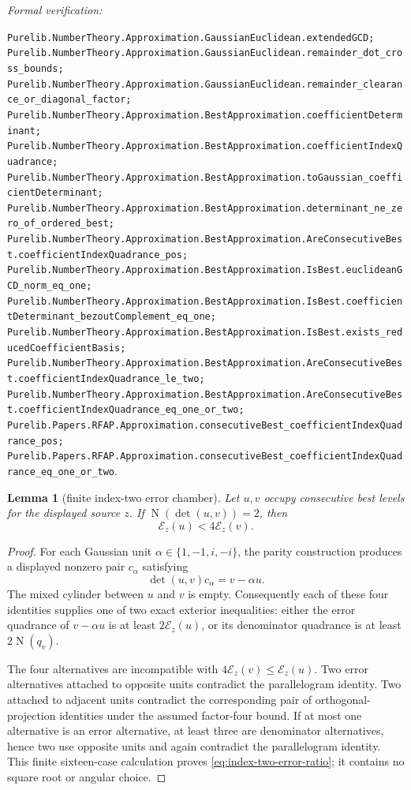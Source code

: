 \documentclass[11pt]{article}
\newtheorem{lemma}[lemma]{Lemma}
\newcommand{\Norm}[1]{\operatorname{N}\!\left(#1\right)}
\newcommand{\leanref}[1]{\par\smallskip\noindent
  \emph{Formal verification:}\par\nobreak
  {\raggedright\nolinkurl{#1}.\par}}
\begin{document}
\leanref{Purelib.NumberTheory.Approximation.GaussianEuclidean.extendedGCD;
Purelib.NumberTheory.Approximation.GaussianEuclidean.remainder_dot_cross_bounds;
Purelib.NumberTheory.Approximation.GaussianEuclidean.remainder_clearance_or_diagonal_factor;
Purelib.NumberTheory.Approximation.BestApproximation.coefficientDeterminant;
Purelib.NumberTheory.Approximation.BestApproximation.coefficientIndexQuadrance;
Purelib.NumberTheory.Approximation.BestApproximation.toGaussian_coefficientDeterminant;
Purelib.NumberTheory.Approximation.BestApproximation.determinant_ne_zero_of_ordered_best;
Purelib.NumberTheory.Approximation.BestApproximation.AreConsecutiveBest.coefficientIndexQuadrance_pos;
Purelib.NumberTheory.Approximation.BestApproximation.IsBest.euclideanGCD_norm_eq_one;
Purelib.NumberTheory.Approximation.BestApproximation.IsBest.coefficientDeterminant_bezoutComplement_eq_one;
Purelib.NumberTheory.Approximation.BestApproximation.IsBest.exists_reducedCoefficientBasis;
Purelib.NumberTheory.Approximation.BestApproximation.AreConsecutiveBest.coefficientIndexQuadrance_le_two;
Purelib.NumberTheory.Approximation.BestApproximation.AreConsecutiveBest.coefficientIndexQuadrance_eq_one_or_two;
Purelib.Papers.RFAP.Approximation.consecutiveBest_coefficientIndexQuadrance_pos;
Purelib.Papers.RFAP.Approximation.consecutiveBest_coefficientIndexQuadrance_eq_one_or_two}

\begin{lemma}[finite index-two error chamber]
\label{lem:index-two-error-chamber}
Let $u,v$ occupy consecutive best levels for the displayed source $z$.  If
$\Norm{\det(u,v)}=2$, then
\begin{equation}
\label{eq:index-two-error-ratio}
                  \mathcal E_z(u)<4\mathcal E_z(v).
\end{equation}
\end{lemma}

\begin{proof}
For each Gaussian unit $\alpha\in\{1,-1,i,-i\}$, the parity construction
produces a displayed nonzero pair $c_\alpha$ satisfying
\[
       \det(u,v)c_\alpha=v-\alpha u.
\]
The mixed cylinder between $u$ and $v$ is empty.  Consequently each of these
four identities supplies one of two exact exterior inequalities: either the
error quadrance of $v-\alpha u$ is at least
$2\mathcal E_z(u)$, or its denominator quadrance is at least
$2\Norm{q_v}$.

The four alternatives are incompatible with
$4\mathcal E_z(v)\le\mathcal E_z(u)$.  Two error alternatives attached to
opposite units contradict the parallelogram identity.  Two attached to
adjacent units contradict the corresponding pair of orthogonal-projection
identities under the assumed factor-four bound.  If at most one alternative
is an error alternative, at least three are denominator alternatives, hence
two use opposite units and again contradict the parallelogram identity.
This finite sixteen-case calculation proves
\eqref{eq:index-two-error-ratio}; it contains no square root or angular
choice.
\end{proof}
\end{document}
